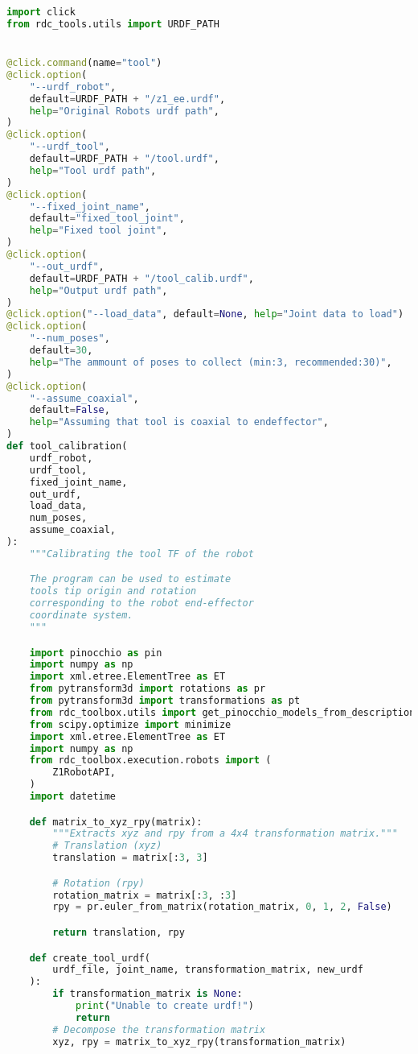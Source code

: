 \begin{lstlisting}[language=python, caption=\raggedright{calibration/tool\_calibration.py}, frame=single]
import click
from rdc_tools.utils import URDF_PATH


@click.command(name="tool")
@click.option(
    "--urdf_robot",
    default=URDF_PATH + "/z1_ee.urdf",
    help="Original Robots urdf path",
)
@click.option(
    "--urdf_tool",
    default=URDF_PATH + "/tool.urdf",
    help="Tool urdf path",
)
@click.option(
    "--fixed_joint_name",
    default="fixed_tool_joint",
    help="Fixed tool joint",
)
@click.option(
    "--out_urdf",
    default=URDF_PATH + "/tool_calib.urdf",
    help="Output urdf path",
)
@click.option("--load_data", default=None, help="Joint data to load")
@click.option(
    "--num_poses",
    default=30,
    help="The ammount of poses to collect (min:3, recommended:30)",
)
@click.option(
    "--assume_coaxial",
    default=False,
    help="Assuming that tool is coaxial to endeffector",
)
def tool_calibration(
    urdf_robot,
    urdf_tool,
    fixed_joint_name,
    out_urdf,
    load_data,
    num_poses,
    assume_coaxial,
):
    """Calibrating the tool TF of the robot

    The program can be used to estimate
    tools tip origin and rotation
    corresponding to the robot end-effector
    coordinate system.
    """

    import pinocchio as pin
    import numpy as np
    import xml.etree.ElementTree as ET
    from pytransform3d import rotations as pr
    from pytransform3d import transformations as pt
    from rdc_toolbox.utils import get_pinocchio_models_from_description
    from scipy.optimize import minimize
    import xml.etree.ElementTree as ET
    import numpy as np
    from rdc_toolbox.execution.robots import (
        Z1RobotAPI,
    )
    import datetime

    def matrix_to_xyz_rpy(matrix):
        """Extracts xyz and rpy from a 4x4 transformation matrix."""
        # Translation (xyz)
        translation = matrix[:3, 3]

        # Rotation (rpy)
        rotation_matrix = matrix[:3, :3]
        rpy = pr.euler_from_matrix(rotation_matrix, 0, 1, 2, False)

        return translation, rpy

    def create_tool_urdf(
        urdf_file, joint_name, transformation_matrix, new_urdf
    ):
        if transformation_matrix is None:
            print("Unable to create urdf!")
            return
        # Decompose the transformation matrix
        xyz, rpy = matrix_to_xyz_rpy(transformation_matrix)


\end{lstlisting}
